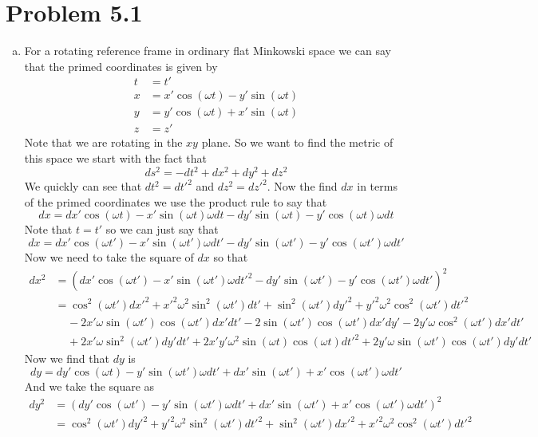 \documentclass[11pt]{article}
\numberwithin{equation}{section}
\newcommand{\HWnum}{5}
\begin{document}


\section{Problem \HWnum.1}
\begin{enumerate}[(a)]
\item
For a rotating reference frame in ordinary flat Minkowski space we can say that  the primed coordinates is given by
\begin{align*}
t &= t'\\
x &= x'\cos(\omega t) - y'\sin(\omega t)\\
y &= y'\cos(\omega t) + x'\sin(\omega t)\\
z &= z'
\end{align*}
Note that we are rotating in the $xy$ plane. So we want to find the metric of this space we start with the fact that 
$$ds^2 = -dt^2 + dx^2 + dy^2 +dz^2$$
We quickly can see that $dt^2 = dt'^2$ and $dz^2 = dz'^2$. Now the find $dx$ in terms of the primed coordinates we use the product rule to say that
$$dx = dx'\cos(\omega t) - x'\sin(\omega t)\omega dt - dy'\sin(\omega t) -y'\cos(\omega t)\omega dt$$
Note that $t=t'$ so we can just say that
$$dx = dx'\cos(\omega t') - x'\sin(\omega t')\omega dt' - dy'\sin(\omega t') -y'\cos(\omega t')\omega dt'$$
Now we need to take the square of $dx$ so that
\begin{align*}
dx^2 &= \left(dx'\cos(\omega t') - x'\sin(\omega t')\omega dt'^2 - dy'\sin(\omega t') -y'\cos(\omega t')\omega dt'\right)^2 \\
&= \cos^2(\omega t')dx'^2 + x'^2\omega^2\sin^2(\omega t')dt' +\sin^2(\omega t')dy'^2 + y'^2\omega^2\cos^2(\omega t')dt'^2\\
&\ \ \ \ \ -2x'\omega\sin(\omega t')\cos(\omega t')dx'dt' - 2\sin(\omega t')\cos(\omega t')dx'dy' - 2y'\omega\cos^2(\omega t')dx'dt'\\
&\ \ \ \ \ +2x'\omega\sin^2(\omega t')dy'dt' + 2x'y'\omega^2\sin(\omega t)\cos(\omega t)dt'^2 + 2y'\omega\sin(\omega t')\cos(\omega t')dy'dt'
\end{align*}
Now we find that $dy$ is
$$dy = dy'\cos(\omega t) - y'\sin(\omega t')\omega dt' + dx'\sin(\omega t') + x'\cos(\omega t')\omega dt'$$
And we take the square as
\begin{align*}
dy^2 &= \left(dy'\cos(\omega t') - y'\sin(\omega t')\omega dt' + dx'\sin(\omega t') + x'\cos(\omega t')\omega dt'\right)^2\\
&= \cos^2(\omega t')dy'^2 + y'^2\omega^2\sin^2(\omega t')dt'^2 + \sin^2(\omega t')dx'^2 +x'^2\omega^2\cos^2(\omega t')dt'^2\\

\end{align*}
\end{enumerate}
\end{document}
